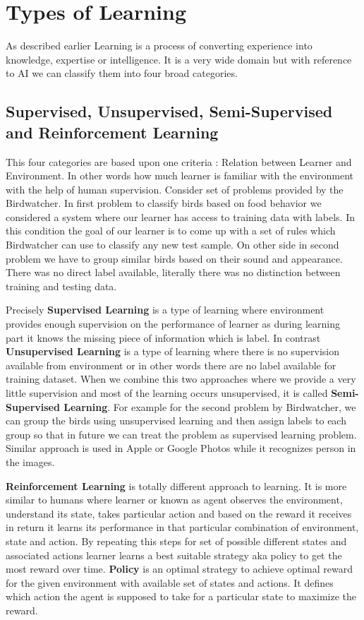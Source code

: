 \documentclass[a4paper]{article}
\begin{document}
\section{Types of Learning}
As described earlier Learning is a process of converting experience into knowledge, expertise or intelligence. It is a very wide domain but with reference to AI we can classify them into four broad categories. 

\subsection{Supervised, Unsupervised, Semi-Supervised and Reinforcement Learning}
This four categories are based upon one criteria : Relation between Learner and Environment. In other words how much learner is familiar with the environment with the help of human supervision. Consider set of problems provided by the Birdwatcher. In first problem to classify birds based on food behavior we considered a system where our learner has access to training data with labels. In this condition the goal of our learner is to come up with a set of rules which Birdwatcher can use to classify any new test sample. On other side in second problem we have to group similar birds based on their sound and appearance. There was no direct label available, literally there was no distinction between training and testing data. 

Precisely \textbf{Supervised Learning} is a type of learning where environment provides enough supervision on the performance of learner as during learning part it knows the missing piece of information which is label. In contrast \textbf{Unsupervised Learning} is a type of learning where there is no supervision available from environment or in other words there are no label available for training dataset. When we combine this two approaches where we provide a very little supervision and most of the learning occurs unsupervised, it is called \textbf{Semi-Supervised Learning}. For example for the second problem by Birdwatcher, we can group the birds using unsupervised learning and then assign labels to each group so that in future we can treat the problem as supervised learning problem. Similar approach is used in Apple or Google Photos while it recognizes person in the images.

\textbf{Reinforcement Learning} is totally different approach to learning. It is more similar to humans where learner or known as agent observes the environment, understand its state, takes particular action and based on the reward it receives in return it learns its performance in that particular combination of environment, state and action. By repeating this steps for set of possible different states and associated actions learner learns a best suitable strategy aka policy to get the most reward over time. \textbf{Policy} is an optimal strategy to achieve optimal reward for the given environment with available set of states and actions. It defines which action the agent is supposed to take for a particular state to maximize the reward. 
\end{document}
